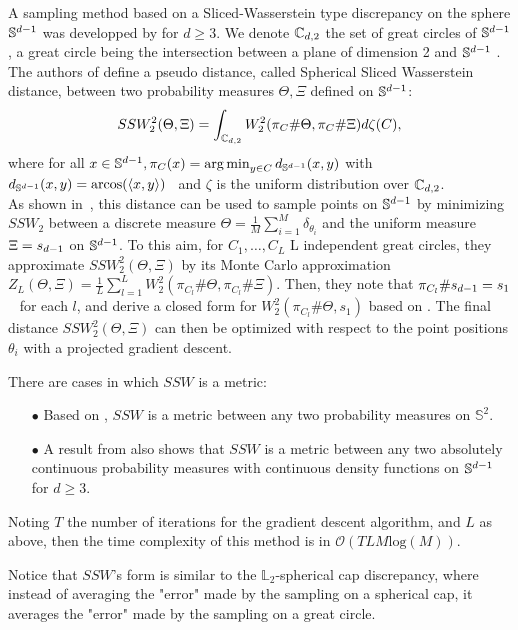{A sampling method based on a Sliced-Wasserstein type discrepancy on the sphere $\mathbb{S}^{d-1}$ was developped by \citet{bonet2023sphericalslicedwasserstein} for $d\geq 3$.
We denote $\mathbb{C}_{d,2}$ the set of great circles of $\mathbb{S}^{d-1}$, a great circle being the intersection between a plane of dimension 2 and $\mathbb{S}^{d-1}$ \citep{jung2012}. The authors of \citet{bonet2023sphericalslicedwasserstein}
define a pseudo distance, called Spherical Sliced Wasserstein distance, between two probability measures $\Theta,\Xi$ defined on $\mathbb{S}^{d-1}$:
\begin{equation}\label{eq:SSW}
SSW_2^2(\Theta,\Xi) = \displaystyle\int_{\mathbb{C}_{d,2}} W_2^2(\pi_C\#\Theta,\pi_C\#\Xi)d\zeta(C),
\end{equation}
where for all $x\in\mathbb{S}^{d-1}, \pi_C(x) = \operatorname*{arg\,min}_{y\in C} d_{\mathbb{S}^{d-1}}(x,y)$ with $d_{\mathbb{S}^{d-1}}(x,y) = \text{arcos}(\langle x,y\rangle)$~\citep{Fletcher2004} and $\zeta$ is the uniform distribution over $\mathbb{C}_{d,2}$.\\
As shown in~\citet{bonet2023sphericalslicedwasserstein}, this distance can be used to sample points on $\mathbb{S}^{d-1}$ by minimizing $SSW_2$ between a discrete measure $\Theta = \frac{1}{M}\sum\limits_{i=1}^M \delta_{\theta_i}$ and the uniform measure $\Xi = s_{d-1}$ on $\mathbb{S}^{d-1}$. 
To this aim, for $C_1,\hdots,C_L$ L independent great circles, they approximate $SSW_2^2(\Theta,\Xi)$  by  its Monte Carlo approximation $Z_L(\Theta,\Xi) =\displaystyle\frac{1}{L}\sum\limits_{l = 1}^L W_2^2(\pi_{C_l}\# \Theta, \pi_{C_l}\# \Xi)$.
Then, they note that $\pi_{C_l}\#s_{d-1} = s_1$~\citep{Jung2021} for each $l$, and derive a closed form for $W_2^2(\pi_{C_l}\# \Theta, s_1)$ based on \citet{ delon2010transportationdistancescircleapplications}.
The final distance $SSW_2^2(\Theta,\Xi)$ can then be optimized with respect to the point positions $\theta_i$ with a projected gradient descent.
\begin{Rk}
There are cases in which $SSW$ is a metric:
\begin{itemize}
\item[$\bullet$] Based on \citet{Quellmalz_2023}, $SSW$ is a metric between any two probability measures on $\mathbb{S}^2$.
\item[$\bullet$] A result from \citet{liu2024linearsphericalslicedoptimal} also shows that $SSW$ is a metric between any two absolutely continuous probability measures with continuous density functions on $\mathbb{S}^{d-1}$ for $d\geq 3$.
\end{itemize}
\end{Rk}
\begin{Rk}
Noting $T$ the number of iterations for the gradient descent algorithm, and $L$ as above, then the time complexity of this method is in $\mathcal{O}(TLM\text{log}(M))$.
\end{Rk}
\begin{Rk}
Notice that $SSW$'s form is similar to the $\mathbb{L}_2$-spherical cap discrepancy, where instead of averaging the "error" made by the sampling on a spherical cap, it averages the "error" made by the sampling on a great circle.
\end{Rk}
}


